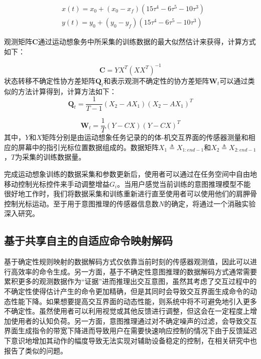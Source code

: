 \begin{equation}
    \begin{aligned}
    & x(t)=x_0+\left(x_0-x_f\right)\left(15 \tau^4-6 \tau^5-10 \tau^3\right) \\
    & y(t)=y_0+\left(y_0-y_f\right)\left(15 \tau^4-6 \tau^5-10 \tau^3\right)
    \end{aligned}
    \label{eq3-9}
\end{equation}

观测矩阵${\boldsymbol{C}}$通过运动想象务中所采集的训练数据的最大似然估计来获得，计算方式如下：

\begin{equation}
\boldsymbol{C} = YX^T(XX^T)^{-1}
\end{equation}
状态转移不确定性协方差矩阵${{\boldsymbol{Q}}_t}$和表示观测不确定性的协方差矩阵${{\boldsymbol{W}}_t}$可以通过类似的方法计算得到，计算方法如下：
\begin{equation}
{\boldsymbol{Q}}_t = \frac{1}{T-1}(X_2 - AX_1)(X_2 - AX_1)^T
\end{equation}

\begin{equation}
{\boldsymbol{W}}_t = \frac{1}{T}(Y - CX)(Y - CX)^T
\end{equation}
其中，$Y$和$X$矩阵分别是由运动想象任务记录的的体-机交互界面的传感器测量和相应的屏幕中的指引光标位置数据组成的。数据矩阵$X_1\triangleq X_{1:end-1}$和$X_2\triangleq X_{2:end-1}$，$T$为采集的训练数据量。

完成运动想象训练的数据采集和参数更新后，使用者可以通过在任务空间中自由地移动控制光标控件来手动调整增益${G_i}$。当用户感觉当前训练的意图推理模型不能很好地工作时，我们将数据采集和训练重新进行直至使用者可以使用他们的肩胛骨控制光标运动。至于用于意图推理的传感器信息数$N$的确定，将通过一个消融实验深入研究。  

\subsection{基于共享自主的自适应命令映射解码}  基于确定性规则映射的数据解码方式仅依靠当前时刻的传感器观测值，因此可以进行高效率的命令生成。另一方面，基于不确定性意图推理的数据解码方式通常需要累积更多的观测数据作为``证据''进而推理出交互意图，虽然其考虑了交互过程中的不确定性使得估计产生的命令更加精确，但是其同时会导致交互界面生成命令的动态性能下降。如果想要提高交互界面的动态性能，则系统中将不可避免地引入更多不确定性。虽然使用者可以利用视觉或其他反馈进行调整，但这会在一定程度上增加使用者的认知负荷。另一方面，意图推理通过对不确定噪声的过滤，会导致交互界面生成指令的带宽下降进而导致用户在需要快速响应控制的情况下由于反馈延迟下意识地增加其动作的幅度导致无法实现对辅助设备稳定的控制，在相关研究\cite{seanez-gonzalezStaticDynamicDecoding2017}中也报告了类似的问题。


